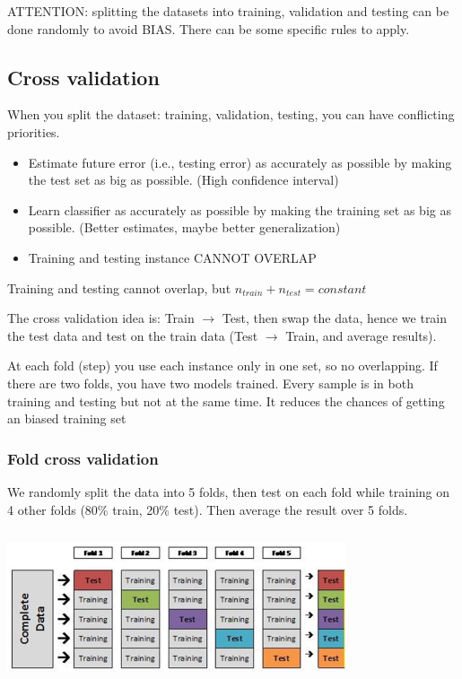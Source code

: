 \documentclass{article}
\begin{document}
ATTENTION: splitting the datasets into training, validation and testing can be done randomly to avoid BIAS. There can be some specific rules to apply.

\subsection*{Cross validation}

When you split the dataset: training, validation, testing, you can have conflicting priorities.
\begin{itemize}
	\item Estimate future error (i.e., testing error) as accurately as possible by making the test set as big as possible. (High confidence interval)
	\item Learn classifier as accurately as possible by making the training set as big as possible. (Better estimates, maybe better generalization)
	\item Training and testing instance CANNOT OVERLAP
\end{itemize}

Training and testing cannot overlap, but \(n_{train} + n_{test} = constant\)

The cross validation idea is: Train $\rightarrow$ Test, then swap the data, hence we train the test data and test on the train data (Test $\rightarrow$ Train, and average results).

At each fold (step) you use each instance only in one set, so no overlapping. If there are two folds, you have two models trained. Every sample is in both training and testing but not at the same time. It reduces the chances of getting an biased training set

\subsubsection*{Fold cross validation}
We randomly split the data into 5 folds, then test on each fold while training on 4 other folds (80\% train, 20\% test). Then average the result over 5 folds.


\centering\includegraphics[width=10cm, height=4.5cm]{img/cross_validation.png}	
\end{document}

